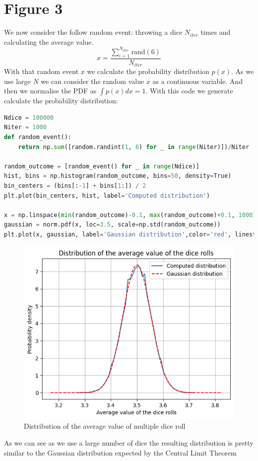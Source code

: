 \documentclass{article}
\begin{document}
\section{Figure 3}
We now consider the follow random event: throwing a dice $N_{iter}$ times and calculating the average value.
\begin{equation}
    x=\frac{\sum_{i=1}^{N_{iter}}{\text{rand}(6)}}{N_{iter}}
\end{equation}
With that random event $x$ we calculate the probability distribution $p(x)$. As we use large $N$ we can consider the random value $x$ as a continuous variable. And then we normalise the PDF as $\int{p(x)dx}=1$.
With this code we generate calculate the probability distribution:
\begin{lstlisting}[language=Python]
Ndice = 100000
Niter = 1000
def random_event():
    return np.sum([random.randint(1, 6) for _ in range(Niter)])/Niter

random_outcome = [random_event() for _ in range(Ndice)]
hist, bins = np.histogram(random_outcome, bins=50, density=True)
bin_centers = (bins[:-1] + bins[1:]) / 2
plt.plot(bin_centers, hist, label='Computed distribution')

x = np.linspace(min(random_outcome)-0.1, max(random_outcome)+0.1, 1000)
gaussian = norm.pdf(x, loc=3.5, scale=np.std(random_outcome))
plt.plot(x, gaussian, label='Gaussian distribution',color='red', linestyle='--')
\end{lstlisting}
\begin{figure}[H]
    \centering
    \includegraphics[width=.9\linewidth]{images/Figure3.png}
    \caption{Distribution of the average value of multiple dice roll}
    \label{fig:3}
\end{figure}
As we can see as we use a large number of dice the resulting distribution is pretty similar to the Gaussian distribution expected by the Central Limit Theorem
\clearpage
\end{document}
